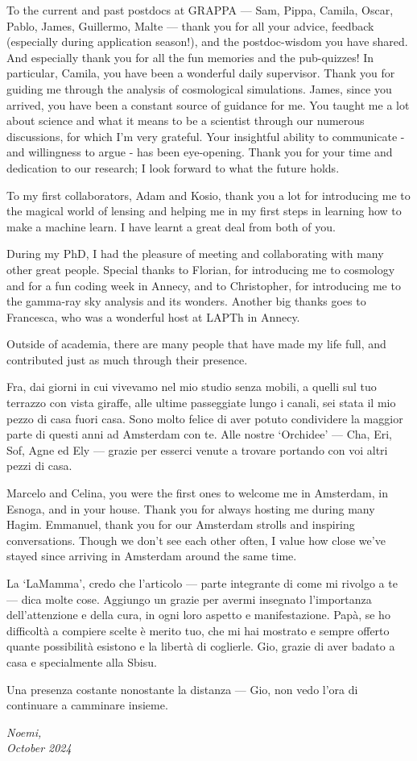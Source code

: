 \clearpage
To the current and past postdocs at GRAPPA --- Sam, Pippa, Camila, Oscar, Pablo, James, Guillermo, Malte --- thank you for all your advice, feedback (especially during application season!), and the postdoc-wisdom you have shared. And especially thank you for all the fun memories and the pub-quizzes! In particular, Camila, you have been a wonderful daily supervisor. Thank you for guiding me through the analysis of cosmological simulations.
James, since you arrived, you have been a constant source of guidance for me. You taught me a lot about science and what it means to be a scientist through our numerous discussions, for which I’m very grateful. Your insightful ability to communicate - and willingness to argue - has been eye-opening. Thank you for your time and dedication to our research; I look forward to what the future holds.

To my first collaborators, Adam and Kosio, thank you a lot for introducing me to the magical world of lensing and helping me in my first steps in learning how to make a machine learn. I have learnt a great deal from both of you.

During my PhD, I had the pleasure of meeting and collaborating with many other great people. Special thanks to Florian, for introducing me to cosmology and for a fun coding week in Annecy, and to Christopher, for introducing me to the gamma-ray sky analysis and its wonders. Another big thanks goes to Francesca, who was a wonderful host at LAPTh in Annecy.

Outside of academia, there are many people that have made my life full, and contributed just as much through their presence.

Fra, dai giorni in cui vivevamo nel mio studio senza mobili, a quelli sul tuo terrazzo con vista giraffe, alle ultime passeggiate lungo i canali, sei stata il mio pezzo di casa fuori casa. Sono molto felice di aver potuto condividere la maggior parte di questi anni ad Amsterdam con te. 
Alle nostre `Orchidee' --- Cha, Eri, Sof, Agne ed Ely --- grazie per esserci venute a trovare portando con voi altri pezzi di casa. 

Marcelo and Celina, you were the first ones to welcome me in Amsterdam, in Esnoga, and in your house. Thank you for always hosting me during many Hagim. 
Emmanuel, thank you for our Amsterdam strolls and inspiring conversations. Though we don’t see each other often, I value how close we’ve stayed since arriving in Amsterdam around the same time.

La `LaMamma', credo che l'articolo --- parte integrante di come mi rivolgo a te --- dica molte cose. Aggiungo un grazie per avermi insegnato l'importanza dell'attenzione e della cura, in ogni loro aspetto e manifestazione. Papà, se ho difficoltà a compiere scelte è merito tuo, che mi hai mostrato e sempre offerto quante possibilità esistono e la libertà di coglierle. Gio, grazie di aver badato a casa e specialmente alla Sbisu. 

\clearpage
Una presenza costante nonostante la distanza --- Gio, non vedo l'ora di continuare a camminare insieme. 

\vskip 2pt

\begin{flushright}
\textit{Noemi, \\
October 2024}
\end{flushright}

